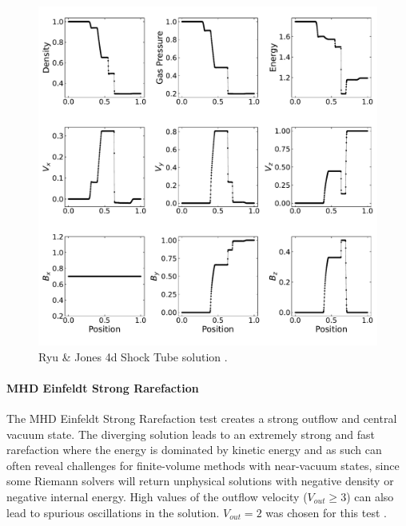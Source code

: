 \begin{figure}[ht!]
    \includegraphics[width=\linewidth]{assets/3-mhd-tests/rj4d.pdf}
    \caption{Ryu \& Jones 4d Shock Tube solution \citep{ryu_jones_1995}.
    }
    \label{fig:rj-4d}
\end{figure}

\paragraph{MHD Einfeldt Strong Rarefaction}

The MHD Einfeldt Strong Rarefaction test \citep{einfeldt_1991} creates a strong outflow and central vacuum state. The diverging solution leads to an extremely strong and fast rarefaction where the energy is dominated by kinetic energy and as such can often reveal challenges for finite-volume methods with near-vacuum states, since some Riemann solvers will return unphysical solutions with negative density or negative internal energy. High values of the outflow velocity ($V_{out}\ge3$) can also lead to spurious oscillations in the solution. $V_{out} = 2$ was chosen for this test \citep{charm_2011}.

